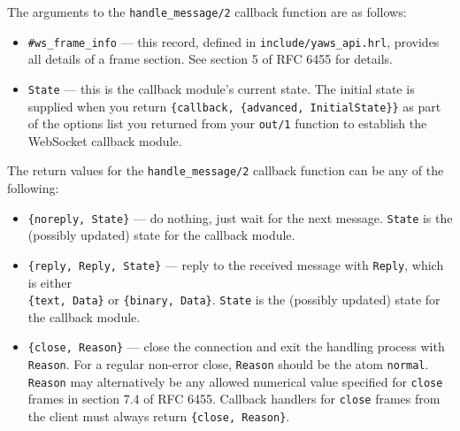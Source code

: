 \documentclass[11pt,oneside,english]{book}
\begin{document}
The arguments to the \verb+handle_message/2+ callback
function are as follows:

\begin{itemize}

\item \verb+#ws_frame_info+ --- this record, defined in
  \verb+include/yaws_api.hrl+, provides all details of a frame
  section. See section 5 of RFC 6455 for details.

\item \verb+State+ --- this is the callback module's current
  state. The initial state is supplied when you return
  \verb+{callback, {advanced, InitialState}}+ as part of the options
  list you returned from your \verb+out/1+ function to establish the
  WebSocket callback module.

\end{itemize}

The return values for the \verb+handle_message/2+ callback function
can be any of the following:

\begin{itemize}

\item \verb+{noreply, State}+ --- do nothing, just wait for the next
  message. \verb+State+ is the (possibly updated) state for the
  callback module.

\item \verb+{reply, Reply, State}+ --- reply to the received message
  with \verb+Reply+, which is either \\ \verb+{text, Data}+ or
  \verb+{binary, Data}+. \verb+State+ is the (possibly updated) state
  for the callback module.

\item \verb+{close, Reason}+ --- close the connection and exit the
  handling process with \verb+Reason+. For a regular non-error close,
  \verb+Reason+ should be the atom \verb+normal+. \verb+Reason+ may
  alternatively be any allowed numerical value specified for
  \verb+close+ frames in section 7.4 of RFC 6455. Callback handlers
  for \verb+close+ frames from the client must always return
  \verb+{close, Reason}+.

\end{itemize}
\end{document}
